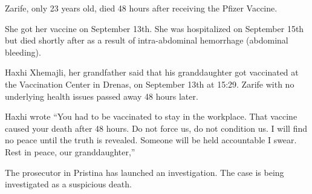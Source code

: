 Zarife, only 23 years old, died 48 hours after receiving the Pfizer Vaccine.

She got her vaccine on September 13th. She was hospitalized on September 15th
but died shortly after as a result of intra-abdominal hemorrhage (abdominal
bleeding).

Haxhi Xhemajli, her grandfather said that his granddaughter got vaccinated at
the Vaccination Center in Drenas, on September 13th at 15:29. Zarife with no
underlying health issues passed away 48 hours later.

Haxhi wrote “You had to be vaccinated to stay in the workplace. That vaccine
caused your death after 48 hours. Do not force us, do not condition us. I will
find no peace until the truth is revealed. Someone will be held accountable I
swear. Rest in peace, our granddaughter,”

The prosecutor in Pristina has launched an investigation. The case is being
investigated as a suspicious death.

